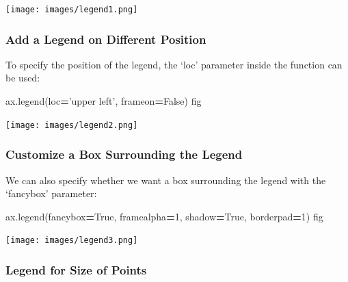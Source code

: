 \documentclass[]{book}
\newenvironment{Shaded}{\begin{snugshade}}{\end{snugshade}}
\newcommand{\DecValTok}[1]{\textcolor[rgb]{0.00,0.00,0.81}{#1}}
\newcommand{\NormalTok}[1]{#1}
\newcommand{\OperatorTok}[1]{\textcolor[rgb]{0.81,0.36,0.00}{\textbf{#1}}}
\newcommand{\StringTok}[1]{\textcolor[rgb]{0.31,0.60,0.02}{#1}}
\newcommand{\VariableTok}[1]{\textcolor[rgb]{0.00,0.00,0.00}{#1}}
\begin{document}
\texttt{[image: images/legend1.png]}

\hypertarget{add-a-legend-on-different-position}{%
\subsubsection{Add a Legend on Different Position}\label{add-a-legend-on-different-position}}

To specify the position of the legend, the `loc' parameter inside the function can be used:

\begin{Shaded}
\begin{Highlighting}[]
\NormalTok{ax.legend(loc}\OperatorTok{=}\StringTok{'upper left'}\NormalTok{, frameon}\OperatorTok{=}\VariableTok{False}\NormalTok{)}
\NormalTok{fig}
\end{Highlighting}
\end{Shaded}

\texttt{[image: images/legend2.png]}

\hypertarget{customize-a-box-surrounding-the-legend}{%
\subsubsection{Customize a Box Surrounding the Legend}\label{customize-a-box-surrounding-the-legend}}

We can also specify whether we want a box surrounding the legend with the `fancybox' parameter:

\begin{Shaded}
\begin{Highlighting}[]
\NormalTok{ax.legend(fancybox}\OperatorTok{=}\VariableTok{True}\NormalTok{, framealpha}\OperatorTok{=}\DecValTok{1}\NormalTok{, shadow}\OperatorTok{=}\VariableTok{True}\NormalTok{, borderpad}\OperatorTok{=}\DecValTok{1}\NormalTok{)}
\NormalTok{fig}
\end{Highlighting}
\end{Shaded}

\texttt{[image: images/legend3.png]}

\hypertarget{legend-for-size-of-points}{%
\subsubsection{Legend for Size of Points}\label{legend-for-size-of-points}}
\end{document}

